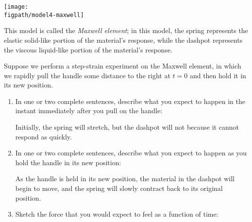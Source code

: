 \begin{activity}
\begin{model}
	\vspace{3pt}
	\centerline{\texttt{[image: \\figpath/model4-maxwell]}}
	
	This model is called the \emph{Maxwell element}; in this model, the spring represents the elastic solid-like portion of the material's response, while the dashpot represents the viscous liquid-like portion of the material's response.
	
\end{model}

	
\begin{ctqs}
	\question Suppose we perform a step-strain experiment on the Maxwell element, in which we rapidly pull the handle some distance to the right at $t=0$ and then hold it in its new position.
	
		\begin{enumerate}
			\item In one or two complete sentences, describe what you expect to happen in the instant immediately after you pull on the handle:
			
				\begin{solution}[1.75in]
					Initially, the spring will stretch, but the dashpot will not because it cannot respond as quickly.
				\end{solution}
			
			\item In one or two complete sentences, describe what you expect to happen as you hold the handle in its new position:
			
				\begin{solution}[1.75in]
					As the handle is held in its new position, the material in the dashpot will begin to move, and the spring will slowly contract back to its original position.
				\end{solution}
			
			\item Sketch the force that you would expect to feel as a function of time: \label{\labelbase:ctq:maxwellstepstrain}
			
				\begin{solution}[1.75in]
				\end{solution}
		\end{enumerate}
					

\end{ctqs}
\end{activity}
